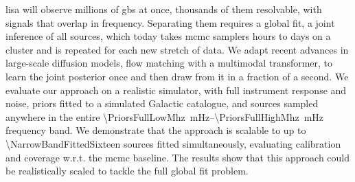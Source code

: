   \Ac{lisa} will observe millions of \acp{gb} at once, thousands of them resolvable, with signals that overlap in frequency. Separating them requires a global fit, a joint inference of all sources, which today takes \ac{mcmc} samplers hours to days on a cluster and is repeated for each new stretch of data. 
  We adapt recent advances in large-scale diffusion models, flow matching with a multimodal transformer, to learn the joint posterior once and then draw from it in a fraction of a second. 
  We evaluate our approach on a realistic simulator, with full instrument response and noise, priors fitted to a simulated Galactic catalogue, and sources sampled anywhere in the entire \qtyrange{\PriorsFullLowMhz}{\PriorsFullHighMhz}{\milli\hertz} frequency band.
  We demonstrate that the approach is scalable to up to \num{\NarrowBandFittedSixteen} sources fitted simultaneously, evaluating calibration and coverage w.r.t. the \ac{mcmc} baseline.
  The results show that this approach could be realistically scaled to tackle the full global fit problem.